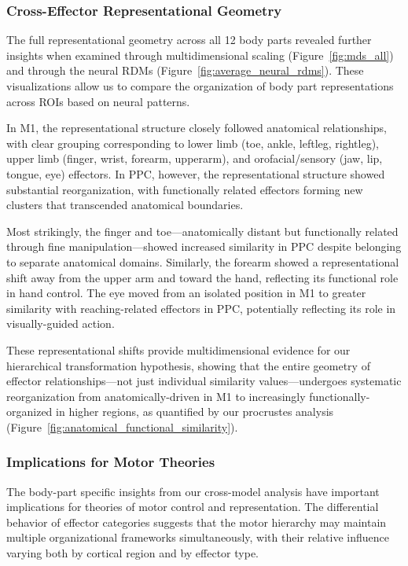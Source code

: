 \documentclass{article}
\begin{document}
\subsubsection{Cross-Effector Representational Geometry}

The full representational geometry across all 12 body parts revealed further insights when examined through multidimensional scaling (Figure~\ref{fig:mds_all}) and through the neural RDMs (Figure~\ref{fig:average_neural_rdms}). These visualizations allow us to compare the organization of body part representations across ROIs based on neural patterns.

In M1, the representational structure closely followed anatomical relationships, with clear grouping corresponding to lower limb (toe, ankle, leftleg, rightleg), upper limb (finger, wrist, forearm, upperarm), and orofacial/sensory (jaw, lip, tongue, eye) effectors. In PPC, however, the representational structure showed substantial reorganization, with functionally related effectors forming new clusters that transcended anatomical boundaries.

Most strikingly, the finger and toe—anatomically distant but functionally related through fine manipulation—showed increased similarity in PPC despite belonging to separate anatomical domains. Similarly, the forearm showed a representational shift away from the upper arm and toward the hand, reflecting its functional role in hand control. The eye moved from an isolated position in M1 to greater similarity with reaching-related effectors in PPC, potentially reflecting its role in visually-guided action.

These representational shifts provide multidimensional evidence for our hierarchical transformation hypothesis, showing that the entire geometry of effector relationships—not just individual similarity values—undergoes systematic reorganization from anatomically-driven in M1 to increasingly functionally-organized in higher regions, as quantified by our procrustes analysis (Figure~\ref{fig:anatomical_functional_similarity}).

\subsubsection{Implications for Motor Theories}

The body-part specific insights from our cross-model analysis have important implications for theories of motor control and representation. The differential behavior of effector categories suggests that the motor hierarchy may maintain multiple organizational frameworks simultaneously, with their relative influence varying both by cortical region and by effector type.
\end{document}
